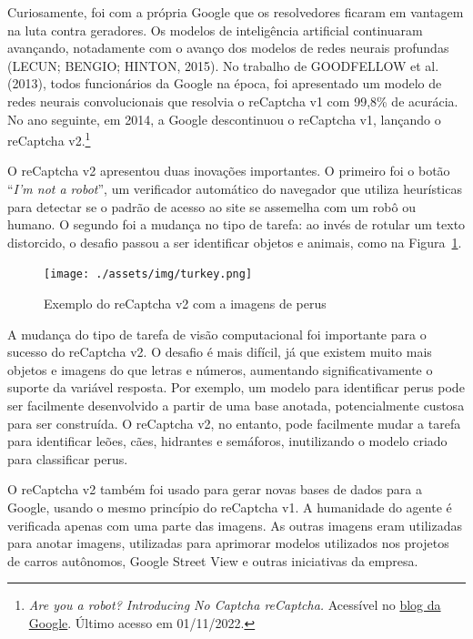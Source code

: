 \documentclass[12pt,twoside,brazilian]{book}
\begin{document}
Curiosamente, foi com a própria Google que os resolvedores ficaram em
vantagem na luta contra geradores. Os modelos de inteligência artificial
continuaram avançando, notadamente com o avanço dos modelos de redes
neurais profundas (LECUN; BENGIO; HINTON, 2015). No trabalho de
GOODFELLOW et al. (2013), todos funcionários da Google na época, foi
apresentado um modelo de redes neurais convolucionais que resolvia o
reCaptcha v1 com 99,8\% de acurácia. No ano seguinte, em 2014, a Google
descontinuou o reCaptcha v1, lançando o reCaptcha v2.\footnote{\emph{Are
  you a robot? Introducing No Captcha reCaptcha.} Acessível no
  \href{https://security.googleblog.com/2014/12/are-you-robot-introducing-no-captcha.html}{blog
  da Google}. Último acesso em 01/11/2022.}

O reCaptcha v2 apresentou duas inovações importantes. O primeiro foi o
botão ``\emph{I'm not a robot}'', um verificador automático do navegador
que utiliza heurísticas para detectar se o padrão de acesso ao site se
assemelha com um robô ou humano. O segundo foi a mudança no tipo de
tarefa: ao invés de rotular um texto distorcido, o desafio passou a ser
identificar objetos e animais, como na Figura~\ref{fig-turkey}.

\begin{figure}

{\centering \texttt{[image: ./assets/img/turkey.png]}

}

\caption{\label{fig-turkey}Exemplo do reCaptcha v2 com a imagens de
perus}

\end{figure}

A mudança do tipo de tarefa de visão computacional foi importante para o
sucesso do reCaptcha v2. O desafio é mais difícil, já que existem muito
mais objetos e imagens do que letras e números, aumentando
significativamente o suporte da variável resposta. Por exemplo, um
modelo para identificar perus pode ser facilmente desenvolvido a partir
de uma base anotada, potencialmente custosa para ser construída. O
reCaptcha v2, no entanto, pode facilmente mudar a tarefa para
identificar leões, cães, hidrantes e semáforos, inutilizando o modelo
criado para classificar perus.

O reCaptcha v2 também foi usado para gerar novas bases de dados para a
Google, usando o mesmo princípio do reCaptcha v1. A humanidade do agente
é verificada apenas com uma parte das imagens. As outras imagens eram
utilizadas para anotar imagens, utilizadas para aprimorar modelos
utilizados nos projetos de carros autônomos, Google Street View e outras
iniciativas da empresa.
\end{document}
